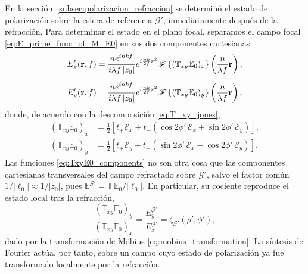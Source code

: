 En la sección~\ref{subsec:polarizacion_refraccion} se determinó el estado
de polarización sobre la esfera de referencia $\mathscr{G}'$, inmediatamente
después de la refracción. Para determinar el estado en el plano focal,
separamos el campo focal \eqref{eq:E_prime_func_of_M_E0} en sus dos
componentes cartesianas,
\begin{equation}
\begin{aligned}
E'_x(\vb r,f)
&=
\frac{n e^{inkf}}{i\lambda f\,|z_0|}
e^{i\frac{nk}{2f}r^2}
\mathscr F\left\{(\mathbb{T}_{xy}\mathbb E_0)_x\right\}
\left(\frac{n}{\lambda f}\vb r\right),
\\[0.5em]
E'_y(\vb r,f)
&=
\frac{n e^{inkf}}{i\lambda f\,|z_0|}
e^{i\frac{nk}{2f}r^2}
\mathscr F\left\{(\mathbb{T}_{xy}\mathbb E_0)_y\right\}
\left(\frac{n}{\lambda f}\vb r\right),
\end{aligned}
\label{eq:Exy_focal_components}
\end{equation}
donde, de acuerdo con la descomposición \eqref{eq:T_xy_jones},
\begin{equation}
\begin{aligned}
(\mathbb{T}_{xy}\mathbb E_0)_x
&=
\frac{1}{2}
\left[
t_+ \mathscr E_x
+
t_-
\left(
\cos 2\phi'\, \mathscr E_x
+
\sin 2\phi'\, \mathscr E_y
\right)
\right],
\\[0.5em]
(\mathbb{T}_{xy}\mathbb E_0)_y
&=
\frac{1}{2}
\left[
t_+ \mathscr E_y
+
t_-
\left(
\sin 2\phi'\, \mathscr E_x
-
\cos 2\phi'\, \mathscr E_y
\right)
\right].
\end{aligned}
\label{eq:TxyE0_components}
\end{equation}
Las funciones \eqref{eq:TxyE0_components} no son otra cosa que las componentes
cartesianas transversales del campo refractado sobre $\mathscr{G}'$, salvo el
factor común $1/|\ell_0| \approx 1/|z_0|$, pues
$\mathbb E^{\mathscr{G}'}=\mathbb{T}\,\mathbb E_0/|\ell_0|$. En particular, su
cociente reproduce el estado local tras la refracción,
\begin{equation}
\frac{
(\mathbb{T}_{xy}\mathbb E_0)_y
}{
(\mathbb{T}_{xy}\mathbb E_0)_x
}
=
\frac{
E_y^{\mathscr{G}'}
}{
E_x^{\mathscr{G}'}
}
=
\zeta_{\mathscr{G}'}(\rho',\phi'),
\label{eq:zeta_Gp_ratio}
\end{equation}
dado por la transformación de Möbius \eqref{eq:mobius_transformation}. La
síntesis de Fourier actúa, por tanto, sobre un campo cuyo estado de
polarización ya fue transformado localmente por la refracción.

